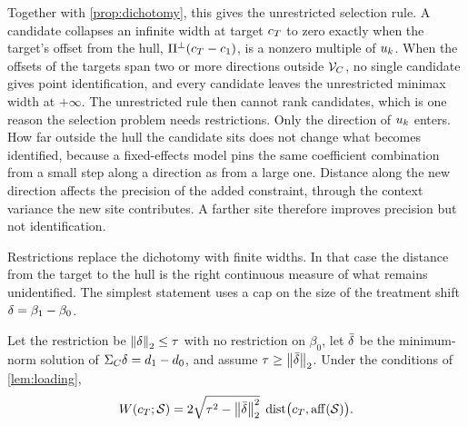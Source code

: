Together with \cref{prop:dichotomy}, this gives the unrestricted
selection rule. A candidate collapses an infinite width at target $c_T$
to zero exactly when the target's offset from the hull,
$\Pi^\perp(c_T-c_1)$, is a nonzero multiple of $u_{k}$. When the
offsets of the targets span two or more directions outside $\mathcal V_C$, no
single candidate gives point identification, and every candidate leaves
the unrestricted minimax width at $+\infty$. The unrestricted rule then
cannot rank candidates, which is one reason the selection problem needs
restrictions. Only the direction of $u_{k}$ enters. How far outside the hull the candidate sits does
not change what becomes identified, because a fixed-effects model pins
the same coefficient combination from a small step along a direction as
from a large one. Distance along the new direction affects the precision of the added
constraint, through the context variance the new site contributes. A
farther site therefore improves precision but not identification.

Restrictions replace the dichotomy with finite widths. In that case the
distance from the target to the hull is the right continuous measure of
what remains unidentified. The simplest statement uses a cap on the size
of the treatment shift $\delta=\beta_1-\beta_0$.

\begin{proposition}
\label{prop:distance}
Let the restriction be $\left\|{\delta}\right\|_2\leq\tau$ with no restriction on
$\beta_0$, let $\bar{\delta}$ be the minimum-norm solution of
$\Sigma_C\delta=d_{1}-d_{0}$, and assume
$\tau\geq\left\|{\bar{\delta}}\right\|_2$. Under the conditions of
\cref{lem:loading},
\begin{equation}
  W(c_T;\mathcal S)
  =2\sqrt{\tau^2-\left\|{\bar{\delta}}\right\|_2^2}\;
  \operatorname{dist}\bigl(c_T,\operatorname{aff}(\mathcal S)\bigr).
  \label{eq:width-distance}
\end{equation}
\end{proposition}

